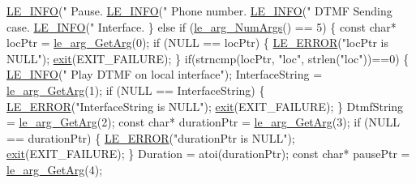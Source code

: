 \begin{DoxyCodeInclude}
{{{{{{{{{{{{{{        \hyperlink{le__log_8h_a23e6d206faa64f612045d688cdde5808}{LE\_INFO}(\textcolor{stringliteral}{"   Pause.%
        \hyperlink{le__log_8h_a23e6d206faa64f612045d688cdde5808}{LE\_INFO}(\textcolor{stringliteral}{"   Phone number.%
        \hyperlink{le__log_8h_a23e6d206faa64f612045d688cdde5808}{LE\_INFO}(\textcolor{stringliteral}{"   DTMF Sending case.%
        \hyperlink{le__log_8h_a23e6d206faa64f612045d688cdde5808}{LE\_INFO}(\textcolor{stringliteral}{"   Interface.%
    \}
    \textcolor{keywordflow}{else} \textcolor{keywordflow}{if} (\hyperlink{le__args_8h_a6fbbeb423104e6eb92fe47ef42b7310a}{le\_arg\_NumArgs}() == 5)
    \{
        \textcolor{keyword}{const} \textcolor{keywordtype}{char}* locPtr = \hyperlink{le__args_8h_a5ebca8229facd069785639cb3c1e273a}{le\_arg\_GetArg}(0);
        \textcolor{keywordflow}{if} (NULL == locPtr)
        \{
            \hyperlink{le__log_8h_a353590f91b3143a7ba3a416ae5a50c3d}{LE\_ERROR}(\textcolor{stringliteral}{"locPtr is NULL"});
            \hyperlink{app_stop_client_8c_a310220604a584e112ba8f7aa3dfe23f1}{exit}(EXIT\_FAILURE);
        \}
        \textcolor{keywordflow}{if}(strncmp(locPtr, \textcolor{stringliteral}{"loc"}, strlen(\textcolor{stringliteral}{"loc"}))==0)
        \{
            \hyperlink{le__log_8h_a23e6d206faa64f612045d688cdde5808}{LE\_INFO}(\textcolor{stringliteral}{"   Play DTMF on local interface"});
            InterfaceString = \hyperlink{le__args_8h_a5ebca8229facd069785639cb3c1e273a}{le\_arg\_GetArg}(1);
            \textcolor{keywordflow}{if} (NULL == InterfaceString)
            \{
                \hyperlink{le__log_8h_a353590f91b3143a7ba3a416ae5a50c3d}{LE\_ERROR}(\textcolor{stringliteral}{"InterfaceString is NULL"});
                \hyperlink{app_stop_client_8c_a310220604a584e112ba8f7aa3dfe23f1}{exit}(EXIT\_FAILURE);
            \}
            DtmfString = \hyperlink{le__args_8h_a5ebca8229facd069785639cb3c1e273a}{le\_arg\_GetArg}(2);
            \textcolor{keyword}{const} \textcolor{keywordtype}{char}* durationPtr = \hyperlink{le__args_8h_a5ebca8229facd069785639cb3c1e273a}{le\_arg\_GetArg}(3);
            \textcolor{keywordflow}{if} (NULL == durationPtr)
            \{
                \hyperlink{le__log_8h_a353590f91b3143a7ba3a416ae5a50c3d}{LE\_ERROR}(\textcolor{stringliteral}{"durationPtr is NULL"});
                \hyperlink{app_stop_client_8c_a310220604a584e112ba8f7aa3dfe23f1}{exit}(EXIT\_FAILURE);
            \}
            Duration = atoi(durationPtr);
            \textcolor{keyword}{const} \textcolor{keywordtype}{char}* pausePtr = \hyperlink{le__args_8h_a5ebca8229facd069785639cb3c1e273a}{le\_arg\_GetArg}(4);
}}}}}}}}}}}}}}}}}}
\end{DoxyCodeInclude}

